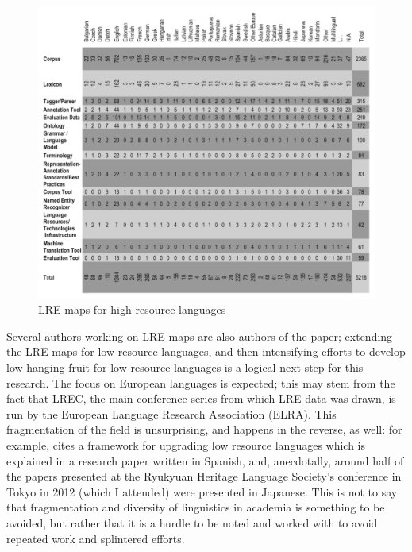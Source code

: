 \begin{figure}
 \centering
 \includegraphics[width=1\textwidth]{img/lre.png}
 \caption{LRE maps for high resource languages \citep[460]{mariani2015language}}
 \label{fig:lre}
\end{figure}

Several authors working on LRE maps are also authors of the \citet{soria2017digital} paper; extending the LRE maps for low resource languages, and then intensifying efforts to develop low-hanging fruit for low resource languages is a logical next step for this research. The focus on European languages is expected; this may stem from the fact that LREC, the main conference series from which LRE data was drawn, is run by the European Language Research Association (ELRA). This fragmentation of the field is unsurprising, and happens in the reverse, as well: for example, \citet{paricio2010new} cites a framework for upgrading low resource languages which is explained in a research paper written in Spanish, and, anecdotally, around half of the papers presented at the Ryukyuan Heritage Language Society's conference in Tokyo in 2012 (which I attended) were presented in Japanese. This is not to say that fragmentation and diversity of linguistics in academia is something to be avoided, but rather that it is a hurdle to be noted and worked with to avoid repeated work and splintered efforts.

%
%

